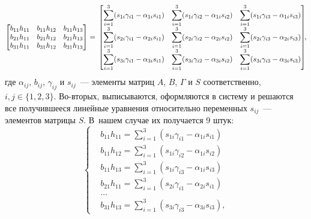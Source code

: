 \documentclass[12pt,a4paper,openany]{extarticle}
\begin{document}
\begin{equation*}
	\begin{bmatrix}
		b_{11}h_{11} & b_{11}h_{12} & b_{11}h_{13} \\
		b_{21}h_{11} & b_{21}h_{12} & b_{21}h_{13} \\
		b_{31}h_{11} & b_{31}h_{12} & b_{31}h_{13}	
	\end{bmatrix}
	= \\	
	\begin{bmatrix}
		\displaystyle\sum_{i=1}^3(s_{1i}\gamma_{i1} - \alpha_{1i}s_{i1}) & \displaystyle\sum_{i=1}^3(s_{1i}\gamma_{i2} - \alpha_{1i}s_{i2})&
		\displaystyle\sum_{i=1}^3(s_{1i}\gamma_{i3} - \alpha_{1i}s_{i3})\\
		\displaystyle\sum_{i=1}^3(s_{2i}\gamma_{i1} - \alpha_{2i}s_{i1}) & \displaystyle\sum_{i=1}^3(s_{2i}\gamma_{i2} - \alpha_{2i}s_{i2})&
		\displaystyle\sum_{i=1}^3(s_{2i}\gamma_{i3} - \alpha_{2i}s_{i3})\\
		\displaystyle\sum_{i=1}^3(s_{3i}\gamma_{i1} - \alpha_{3i}s_{i1}) & \displaystyle\sum_{i=1}^3(s_{3i}\gamma_{i2} - \alpha_{3i}s_{i2})&
		\displaystyle\sum_{i=1}^3(s_{3i}\gamma_{i3} - \alpha_{3i}s_{i3})\\
	\end{bmatrix}\!\!,
\end{equation*}
где $\alpha_{ij}$, $b_{ij}$, $\gamma_{ij}$ и $s_{ij}$~--- элементы матриц $A$, $B$, $\varGamma$ и $S$ соответственно, $i,j\in\{1,2,3\}$.
Во-вторых, выписываются, оформляются в систему и решаются все получившееся линейные уравнения относительно переменных $s_{ij}$~--- элементов матрицы $S$.
В~нашем случае их получается 9 штук:
\begin{equation}
	\left\{
	\begin{aligned}
		&\!b_{11}h_{11} = \displaystyle\sum_{i=1}^3(s_{1i}\gamma_{i1} - \alpha_{1i}s_{i1})\\
		&\!b_{11}h_{12} = \displaystyle\sum_{i=1}^3(s_{1i}\gamma_{i2} - \alpha_{1i}s_{i2})\\
		&\!b_{11}h_{13} = \displaystyle\sum_{i=1}^3(s_{1i}\gamma_{i3} - \alpha_{1i}s_{i3})\\
		&\!b_{21}h_{11} = \displaystyle\sum_{i=1}^3(s_{2i}\gamma_{i1} - \alpha_{2i}s_{i1})\\
		&\!\dots\\
		&\!b_{31}h_{13} = \displaystyle\sum_{i=1}^3(s_{3i}\gamma_{i3} - \alpha_{3i}s_{i3}),
	\end{aligned}
	\right.
\end{equation}
\end{document}
